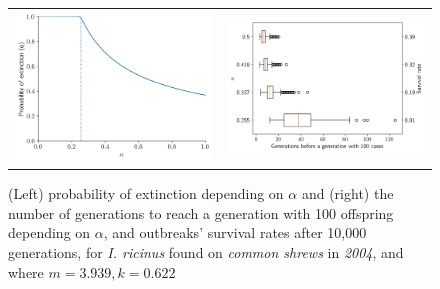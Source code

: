 \documentclass{article}
\begin{document}
\begin{figure}[]
	\begin{mdframed}[backgroundcolor=grey250,rightline=false,leftline=false,topline=false]
		\centering
		\begin{tabular}{ll}
			\includegraphics[width=.46\linewidth,valign=m]{extinctionProbability2004_I. ricinus_SA} & \includegraphics[width=.50\linewidth,valign=m]{firstGeneration100_2004_I. ricinus_SA}
		\end{tabular}
		\caption{(Left) probability of extinction depending on $ \alpha $ and (right) the number of generations to reach a generation with 100 offspring depending on $ \alpha $, and  outbreaks' survival rates after 10,000 generations, for \textit{I. ricinus} found on \textit{common shrews} in \textit{2004}, and where $ m = 3.939, k = 0.622 $ }
		\label{fig:simulation_2004_iricinus_SA}
	\end{mdframed}
\end{figure}
\end{document}
